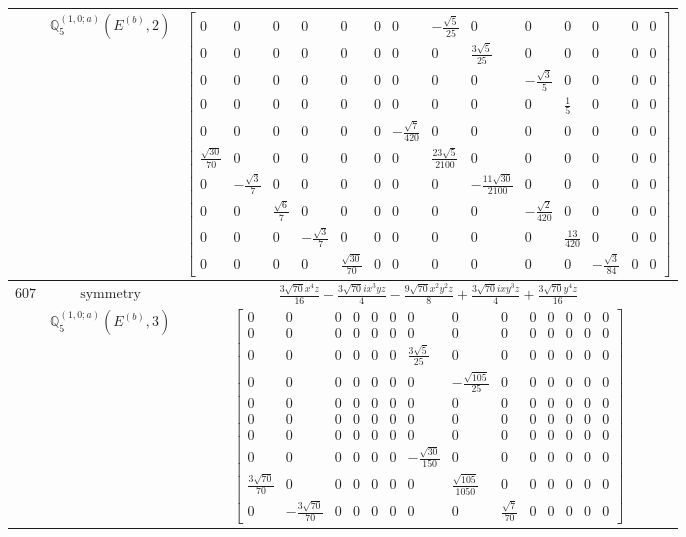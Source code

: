 \documentclass[fleqn,8pt,landscape]{jsarticle}
\begin{document}
\begin{longtable}{ccc}
$  $ & $ \mathbb{Q}_{5}^{(1,0;a)}(E^{(b)},2) $ & $ \begin{bmatrix} 0 & 0 & 0 & 0 & 0 & 0 & 0 & - \frac{\sqrt{5}}{25} & 0 & 0 & 0 & 0 & 0 & 0 \\ 0 & 0 & 0 & 0 & 0 & 0 & 0 & 0 & \frac{3 \sqrt{5}}{25} & 0 & 0 & 0 & 0 & 0 \\ 0 & 0 & 0 & 0 & 0 & 0 & 0 & 0 & 0 & - \frac{\sqrt{3}}{5} & 0 & 0 & 0 & 0 \\ 0 & 0 & 0 & 0 & 0 & 0 & 0 & 0 & 0 & 0 & \frac{1}{5} & 0 & 0 & 0 \\ 0 & 0 & 0 & 0 & 0 & 0 & - \frac{\sqrt{7}}{420} & 0 & 0 & 0 & 0 & 0 & 0 & 0 \\ \frac{\sqrt{30}}{70} & 0 & 0 & 0 & 0 & 0 & 0 & \frac{23 \sqrt{5}}{2100} & 0 & 0 & 0 & 0 & 0 & 0 \\ 0 & - \frac{\sqrt{3}}{7} & 0 & 0 & 0 & 0 & 0 & 0 & - \frac{11 \sqrt{30}}{2100} & 0 & 0 & 0 & 0 & 0 \\ 0 & 0 & \frac{\sqrt{6}}{7} & 0 & 0 & 0 & 0 & 0 & 0 & - \frac{\sqrt{2}}{420} & 0 & 0 & 0 & 0 \\ 0 & 0 & 0 & - \frac{\sqrt{3}}{7} & 0 & 0 & 0 & 0 & 0 & 0 & \frac{13}{420} & 0 & 0 & 0 \\ 0 & 0 & 0 & 0 & \frac{\sqrt{30}}{70} & 0 & 0 & 0 & 0 & 0 & 0 & - \frac{\sqrt{3}}{84} & 0 & 0 \end{bmatrix} $ \\ \hline
$ 607 $ & $ \text{symmetry} $ & $ \frac{3 \sqrt{70} x^{4} z}{16} - \frac{3 \sqrt{70} i x^{3} y z}{4} - \frac{9 \sqrt{70} x^{2} y^{2} z}{8} + \frac{3 \sqrt{70} i x y^{3} z}{4} + \frac{3 \sqrt{70} y^{4} z}{16} $ \\
$  $ & $ \mathbb{Q}_{5}^{(1,0;a)}(E^{(b)},3) $ & $ \begin{bmatrix} 0 & 0 & 0 & 0 & 0 & 0 & 0 & 0 & 0 & 0 & 0 & 0 & 0 & 0 \\ 0 & 0 & 0 & 0 & 0 & 0 & 0 & 0 & 0 & 0 & 0 & 0 & 0 & 0 \\ 0 & 0 & 0 & 0 & 0 & 0 & \frac{3 \sqrt{5}}{25} & 0 & 0 & 0 & 0 & 0 & 0 & 0 \\ 0 & 0 & 0 & 0 & 0 & 0 & 0 & - \frac{\sqrt{105}}{25} & 0 & 0 & 0 & 0 & 0 & 0 \\ 0 & 0 & 0 & 0 & 0 & 0 & 0 & 0 & 0 & 0 & 0 & 0 & 0 & 0 \\ 0 & 0 & 0 & 0 & 0 & 0 & 0 & 0 & 0 & 0 & 0 & 0 & 0 & 0 \\ 0 & 0 & 0 & 0 & 0 & 0 & 0 & 0 & 0 & 0 & 0 & 0 & 0 & 0 \\ 0 & 0 & 0 & 0 & 0 & 0 & - \frac{\sqrt{30}}{150} & 0 & 0 & 0 & 0 & 0 & 0 & 0 \\ \frac{3 \sqrt{70}}{70} & 0 & 0 & 0 & 0 & 0 & 0 & \frac{\sqrt{105}}{1050} & 0 & 0 & 0 & 0 & 0 & 0 \\ 0 & - \frac{3 \sqrt{70}}{70} & 0 & 0 & 0 & 0 & 0 & 0 & \frac{\sqrt{7}}{70} & 0 & 0 & 0 & 0 & 0 \end{bmatrix} $ \\ \hline

\end{longtable}
\end{document}
